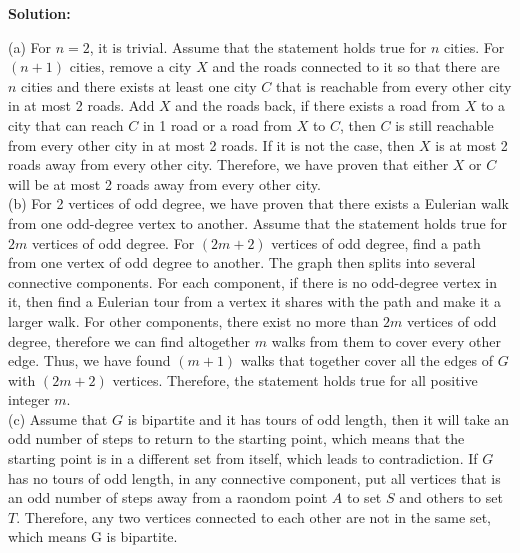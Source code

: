 \documentclass[12pt]{article}
\newenvironment{solution}{\par\noindent\textbf{Solution:}\par}{\par\vspace{1em}}
\begin{document}
\begin{solution}
    \noindent
    (a) For $n=2$, it is trivial. Assume that the statement holds true for $n$ cities.
    For $(n+1)$ cities, remove a city $X$ and the roads connected to it so that there are $n$ cities and there exists at least one city $C$ that is reachable from every other city in at most 2 roads.
    Add $X$ and the roads back, if there exists a road from $X$ to a city that can reach $C$ in 1 road or a road from $X$ to $C$, then $C$ is still reachable from every other city in at most 2 roads.
    If it is not the case, then $X$ is at most 2 roads away from every other city.
    Therefore, we have proven that either $X$ or $C$ will be at most 2 roads away from every other city. \\
    (b) For 2 vertices of odd degree, we have proven that there exists a Eulerian walk from one odd-degree vertex to another.
    Assume that the statement holds true for $2m$ vertices of odd degree. 
    For $(2m+2)$ vertices of odd degree, find a path from one vertex of odd degree to another. The graph then splits into several connective components. 
    For each component, if there is no odd-degree vertex in it, then find a Eulerian tour from a vertex it shares with the path and make it a larger walk. 
    For other components, there exist no more than $2m$ vertices of odd degree, therefore we can find altogether $m$ walks from them to cover every other edge.
    Thus, we have found $(m+1)$ walks that together cover all the edges of $G$ with $(2m+2)$ vertices. Therefore, the statement holds true for all positive integer $m$.\\
    (c) Assume that $G$ is bipartite and it has tours of odd length, then it will take an odd number of steps to return to the starting point, which means that the starting point is in a different set from itself, which leads to contradiction.
    If $G$ has no tours of odd length, in any connective component, put all vertices that is an odd number of steps away from a raondom point $A$ to set $S$ and others to set $T$.
    Therefore, any two vertices connected to each other are not in the same set, which means G is bipartite.
\end{solution}
\end{document}
